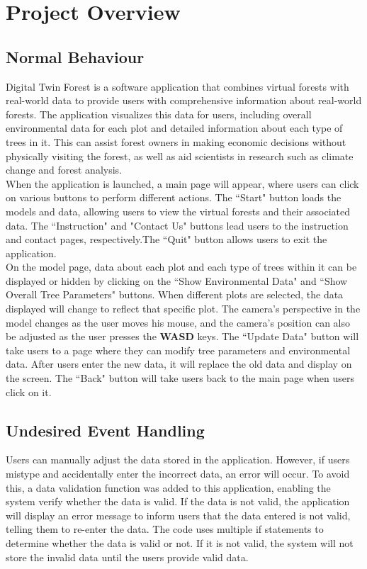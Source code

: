\documentclass[12pt, titlepage]{article}
\begin{document}
\section{Project Overview}

\subsection{Normal Behaviour}
Digital Twin Forest is a software application that combines virtual forests with real-world
data to provide users with comprehensive information about real-world forests. The
application visualizes this data for users, including overall environmental data for each plot
and detailed information about each type of trees in it. This can assist forest owners in
making economic decisions without physically visiting the forest, as well as aid scientists in
research such as climate change and forest analysis.\\

\noindent When the application is launched, a main page will appear, where users can click on
various buttons to perform different actions. The ``Start" button loads the models and data,
allowing users to view the virtual forests and their associated data. The ``Instruction" and
"Contact Us" buttons lead users to the instruction and contact pages, respectively.The ``Quit"
button allows users to exit the application.\\


\noindent On the model page, data about each plot and each type of trees within it can be
displayed or hidden by clicking on the ``Show Environmental Data" and ``Show Overall Tree
Parameters" buttons. When different plots are selected, the data displayed will change to
reflect that specific plot. The camera's perspective in the model changes as the user moves
his mouse, and the camera's position can also be adjusted as the user presses the
\textbf{WASD} keys. The ``Update Data" button will take users to a page where they can modify
tree parameters and environmental data. After users enter the new data, it will replace the
old data and display on the screen.
The ``Back" button will take users back to the main page when users click on it.

\subsection{Undesired Event Handling}

Users can manually adjust the data stored in the application. However, if users mistype and
accidentally enter the incorrect data, an error will occur. To avoid this, a data validation
function was added to this application, enabling the system verify whether the data is valid.
If the data is not valid, the application will display an error message to inform users that
the data entered is not valid, telling them to re-enter the data. The code uses multiple if
statements to determine whether the data is valid or not. If it is not valid, the system will
not store the invalid data until the users provide valid data.
\end{document}
